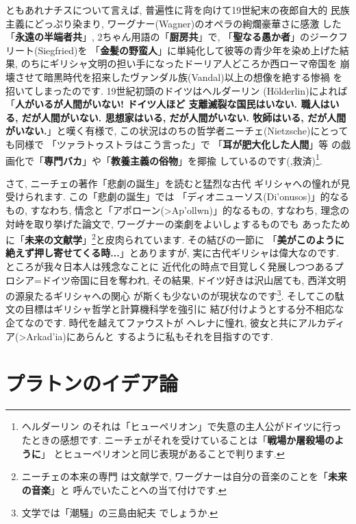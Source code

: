 \documentclass[b5j,8pt,twocolumn]{ltjsarticle}
\newcommand{\textgreek}[1]{\begingroup\fontencoding{LGR}\selectfont#1\endgroup}
\begin{document}
ともあれナチスについて言えば, 普遍性に背を向けて19世紀末の夜郎自大的
民族主義にどっぷり染まり, ワーグナー(Wagner)のオペラの絢爛豪華さに感激
した「\textbf{永遠の半端者共}」, 2ちゃん用語の「\textbf{厨房共}」で,
 「\textbf{聖なる愚か者}」のジークフリート(Siegfried)を
「\textbf{金髪の野蛮人}」に単純化して彼等の青少年を染め上げた結果,
 のちにギリシャ文明の担い手になったドーリア人どころか西ローマ帝国を
崩壊させて暗黒時代を招来したヴァンダル族(Vandal)以上の想像を絶する惨禍
を招いてしまったのです. 19世紀初頭のドイツはヘルダーリン
(H\"olderlin)によれば「\textbf{人がいるが人間がいない! ドイツ人ほど
支離滅裂な国民はいない. 職人はいる, だが人間がいない. 思想家はいる,
 だが人間がいない. 牧師はいる, だが人間がいない.}」と嘆く有様で,
 この状況はのちの哲学者ニーチェ(Nietzsche)にとっても同様で
「ツァラトゥストラはこう言った」で 「\textbf{耳が肥大化した人間}」等
の戯画化で「\textbf{専門バカ}」や「\textbf{教養主義の俗物}」を揶揄
しているのです(\cite{ツァラトゥストラ},救済)\footnote{ヘルダーリン
のそれは「ヒューペリオン」で失意の主人公がドイツに行ったときの感想です.
 ニーチェがそれを受けていることは「\textbf{戦場か屠殺場のように}」
 とヒューペリオンと同じ表現があることで判ります.}.
\newline

さて, ニーチェの著作「悲劇の誕生」\cite{悲劇の誕生}を読むと猛烈な古代
ギリシャへの憧れが見受けられます. この「悲劇の誕生」では
「ディオニューソス(\textgreek{Di'onusos})」的なるもの, すなわち,
情念と「アポローン(\textgreek{>Ap'ollwn})」的なるもの, すなわち,
 理念の対峙を取り挙げた論文で, ワーグナーの楽劇をよいしょするものでも
あったために「\textbf{未来の文献学}」\footnote{ニーチェの本来の専門
は文献学で, ワーグナーは自分の音楽のことを「\textbf{未来の音楽}」と
呼んでいたことへの当て付けです.}と皮肉られています. その結びの一節に
「\textbf{美がこのように絶えず押し寄せてくる時...}」とありますが,
 実に古代ギリシャは偉大なのです. ところが我々日本人は残念なことに
近代化の時点で目覚しく発展しつつあるプロシア=ドイツ帝国に目を奪われ,
 その結果, ドイツ好きは沢山居ても, 西洋文明の源泉たるギリシャへの関心
が斯くも少ないのが現状なのです\footnote{文学では「潮騒」の三島由紀夫
でしょうか.}. そしてこの駄文の目標はギリシャ哲学と計算機科学を強引に
結び付けようとする分不相応な企てなのです. 時代を越えてファウストが
ヘレナに憧れ, 彼女と共にアルカディア(\textgreek{>Arkad'ia})にあらんと
するように私もそれを目指すのです.

\section{プラトンのイデア論}
\end{document}
